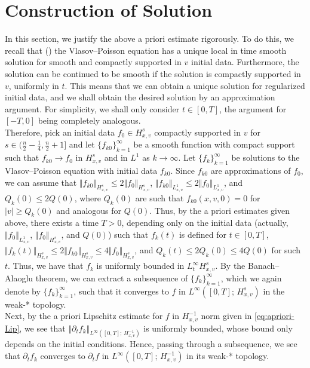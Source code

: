 \documentclass[11pt]{amsart}
\theoremstyle{definition}
\theoremstyle{remark}
\numberwithin{equation}{section}
\newcommand{\0}{\emptyset}
\begin{document}
	\section{Construction of Solution}\label{sec:const}
	In this section, we justify the above a priori estimate rigorously. To do this, we recall that (\cite{Glassey96,Horst,Horst2}) the Vlasov--Poisson equation has a unique local in time smooth solution for smooth and compactly supported in $v$ initial data. Furthermore, the solution can be continued to be smooth if the solution is compactly supported in $v$, uniformly in $t$. This means that we can obtain a unique solution for regularized initial data, and we shall obtain the desired solution by an approximation argument. For simplicity, we shall only consider $t\in [0,T]$, the argument for $[-T,0]$ being completely analogous. \\
	
	Therefore, pick an initial data $f_0\in H^s_{x,v}$ compactly supported in $v$ for $s\in (\frac{n}{2}-\frac{1}{4}, \frac{n}{2}+1]$ and let $\{f_{k0}\}_{k=1}^{\infty}$ be a smooth function with compact support such that $f_{k0}\to f_0$ in $H^s_{x,v}$ and in $L^1$ as $k\to\infty$. Let $\{f_k\}_{k=1}^{\infty}$ be solutions to the Vlasov--Poisson equation with initial data $f_{k0}$. Since $f_{k0}$ are approximations of $f_0$, we can assume that $\Vert f_{k0}\Vert_{H^s_{x, v}}\leq 2\Vert f_0 \Vert_{H^s_{x, v}}$, $\Vert f_{k0} \Vert_{L^1_{x, v}}\leq 2\Vert f_0\Vert_{L^1_{x, v}}$, and $Q_k(0)\leq 2Q(0)$, where $Q_{k}(0)$ are such that $f_{k0}(x, v, 0)=0$ for $\vert v\vert\geq Q_k(0)$ and analogous for $Q(0)$. Thus, by the a priori estimates given above, there exists a time $T>0$, depending only on the initial data (actually, $\Vert f_0\Vert_{L^1_{x, v}}$, $\Vert  f_0\Vert_{H^s_{x, v}}$, and $Q(0)$) such that $f_k(t)$ is defined for $t\in[0, T]$, $\Vert f_k(t)\Vert_{H^s_{x, v}}\leq 2\Vert f_{k0}\Vert_{H^s_{x, v}}\leq 4\Vert f_0\Vert_{H^s_{x, v}}$, and $Q_k(t)\leq 2Q_k(0)\leq 4Q(0)$ for such $t$. Thus, we have that $f_k$ is uniformly bounded in $L^\infty_t H^s_{x, v}$. By the Banach--Alaoglu theorem, we can extract a subsequence of $\{f_k\}_{k=1}^\infty$, which we again denote by $\{f_k\}_{k=1}^\infty$, such that it converges to $f$ in $L^\infty([0, T];\,H^s_{x, v})$ in the weak-* topology. \\
	
	Next, by the a priori Lipschitz estimate for $f$ in $H^{-1}_{x, v}$ norm given in \eqref{eq:apriori-Lip}, we see that $\Vert \partial_tf_k \Vert_{L^\infty([0, T];\,H^{-1}_{x,v})}$ is uniformly bounded, whose bound only depends on the initial conditions. Hence, passing through a subsequence, we see that $\partial_t f_k$ converges to $\partial_t f$ in $L^\infty([0, T];\,H^{-1}_{x, v} )$ in its weak-* topology.\\
	
\end{document}
